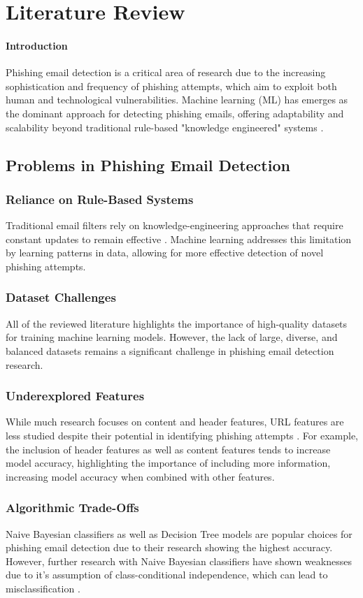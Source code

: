 \section{Literature Review}
\paragraph{Introduction}
Phishing email detection is a critical area of research due to the increasing sophistication and frequency of phishing attempts, which aim to exploit both human and technological vulnerabilities. Machine learning (ML) has emerges as the dominant approach for detecting phishing emails, offering adaptability and scalability beyond traditional rule-based "knowledge engineered" systems \cite{nandhini2020}.

\subsection{Problems in Phishing Email Detection}
\subsubsection{Reliance on Rule-Based Systems}
Traditional email filters rely on knowledge-engineering approaches that require constant updates to remain effective \cite{nandhini2020}. Machine learning addresses this limitation by learning patterns in data, allowing for more effective detection of novel phishing attempts.
\subsubsection{Dataset Challenges}
All of the reviewed literature highlights the importance of high-quality datasets for training machine learning models. However, the lack of large, diverse, and balanced datasets remains a significant challenge in phishing email detection research.
\subsubsection{Underexplored Features}
While much research focuses on content and header features, URL features are less studied despite their potential in identifying phishing attempts \cite{atlam2022}. For example, the inclusion of header features as well as content features tends to increase model accuracy, highlighting the importance of including more information, increasing model accuracy when combined with other features.
\subsubsection{Algorithmic Trade-Offs}
Naive Bayesian classifiers as well as Decision Tree models are popular choices for phishing email detection due to their research showing the highest accuracy. However, further research with Naive Bayesian classifiers have shown weaknesses due to it's assumption of class-conditional independence, which can lead to misclassification \cite{ahmed2022}.

